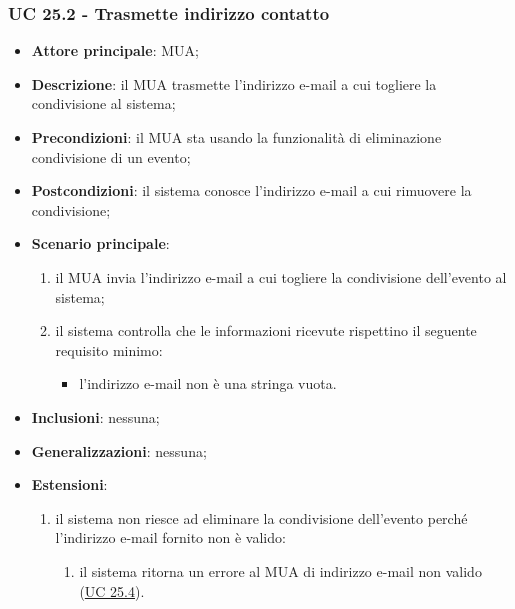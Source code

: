     \subsubsection{UC 25.2 - Trasmette indirizzo contatto} \label{sec:UC25.2}
    \begin{itemize}
        \item \textbf{Attore principale}: MUA;
        \item \textbf{Descrizione}: il MUA trasmette l'indirizzo e-mail a cui togliere la condivisione al sistema;
        \item \textbf{Precondizioni}: il MUA sta usando la funzionalità di eliminazione condivisione di un evento;
        \item \textbf{Postcondizioni}: il sistema conosce l'indirizzo e-mail a cui rimuovere la condivisione;
        \item \textbf{Scenario principale}:
            \begin{enumerate}
                \item il MUA invia l'indirizzo e-mail a cui togliere la condivisione dell'evento al sistema;
                \item il sistema controlla che le informazioni ricevute rispettino il seguente requisito minimo:
                    \begin{itemize}
                        \item l'indirizzo e-mail non è una stringa vuota.
                    \end{itemize}
            \end{enumerate}
        \item \textbf{Inclusioni}: nessuna;
        \item \textbf{Generalizzazioni}: nessuna;
        \item \textbf{Estensioni}:
            \begin{enumerate}[label=\alph*.]
                \item il sistema non riesce ad eliminare la condivisione dell'evento perché l'indirizzo e-mail fornito non è valido:
                \begin{enumerate}[label=\arabic*.]
                    \item il sistema ritorna un errore al MUA di indirizzo e-mail non valido (\hyperref[sec:UC25.4]{UC 25.4}).
                \end{enumerate}
            \end{enumerate}
    \end{itemize}


